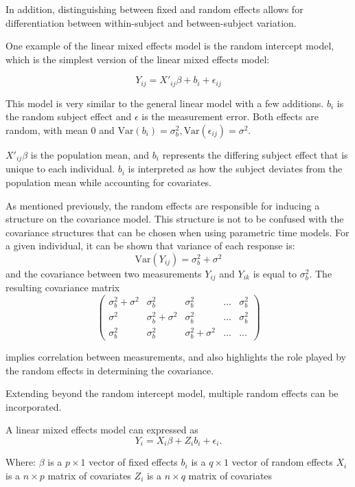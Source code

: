 \documentclass[12pt, twoside]{amherstthesis}
\begin{document}
In addition, distinguishing between fixed and random effects allows for differentiation between within-subject and between-subject variation.

One example of the linear mixed effects model is the random intercept model, which is the simplest version of the linear mixed effects model:

\[Y_{ij} = X'_{ij}\beta + b_i + \epsilon_{ij}\]

This model is very similar to the general linear model with a few additions. \(b_i\) is the random subject effect and \(\epsilon\) is the measurement error. Both effects are random, with mean 0 and \(\text{Var}(b_i) = \sigma^2_b, \text{Var}(\epsilon_{ij})=\sigma^2\).

\(X'_{ij}\beta\) is the population mean, and \(b_i\) represents the differing subject effect that is unique to each individual. \(b_i\) is interpreted as how the subject deviates from the population mean while accounting for covariates.

As mentioned previously, the random effects are responsible for inducing a structure on the covariance model. This structure is not to be confused with the covariance structures that can be chosen when using parametric time models. For a given individual, it can be shown that variance of each response is:
\[\text{Var}(Y_{ij}) = \sigma^2_b + \sigma^2\] and the covariance between two measurements \(Y_{ij}\) and \(Y_{ik}\) is equal to \(\sigma^2_b\). The resulting covariance matrix \[\begin{pmatrix} \sigma^2_b + \sigma^2 & \sigma^2_b & \sigma^2_b & ... & \sigma^2_b \\ \sigma^2 & \sigma^2_b + \sigma^2 & \sigma^2_b & ... & \sigma^2_b \\ \sigma^2_b & \sigma^2_b & \sigma^2_b + \sigma^2 & ...& ...   \end{pmatrix}\]

implies correlation between measurements, and also highlights the role played by the random effects in determining the covariance.

Extending beyond the random intercept model, multiple random effects can be incorporated.

A linear mixed effects model can expressed as \[Y_i = X_i\beta+Z_ib_i+\epsilon_i.\]

Where:
\(\beta\) is a \(p \times 1\) vector of fixed effects
\(b_i\) is a \(q \times 1\) vector of random effects
\(X_i\) is a \(n \times p\) matrix of covariates
\(Z_i\) is a \(n \times q\) matrix of covariates
\end{document}
